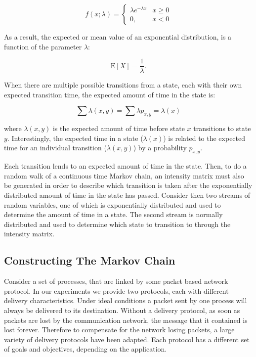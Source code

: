 \begin{equation}
f(x;\lambda) = \begin{cases}
\lambda e^{-\lambda x} & x \ge 0 \\
0, & x < 0
\end{cases}
\end{equation}

As a result, the expected or mean value of an exponential distribution, is a function of
the parameter $\lambda$: \cite{MARKOV1}

\begin{equation}
\mathrm{E}[X] = \frac{1}{\lambda}. \!
\end{equation}

When there are multiple possible transitions from a state, each with their own expected transition time, the expected amount of time in the state is: \cite{MARKOV2}

\begin{equation}
\sum \lambda(x,y) = \sum \lambda p_{x,y} = \lambda(x)
\end{equation}

where $\lambda(x,y)$ is the expected amount of time before state $x$ transitions to state $y$. Interestingly, the expected time in a state ($\lambda(x)$) is related to the expected time for an individual transition ($\lambda(x,y)$) by a probability $p_{x,y}$.

Each transition lends to an expected amount of time in the state. Then, to do a random walk of a continuous time Markov chain, an intensity matrix must also be generated in order to describe which transition is taken after the exponentially distributed amount of time in the state has passed. Consider then two streams of random variables, one of which is exponentially distributed and used to determine the amount of time in a state. The second stream is normally distributed and used to determine which state to transition to through the intensity matrix.



\subsection{Constructing The Markov Chain}

Consider a set of processes, that are linked by some packet based network protocol. In our experiments we provide two protocols, each with different delivery characteristics. Under ideal conditions a packet sent by one process will always be delivered to its destination. Without a delivery protocol, as soon as packets are lost by the communication network, the message that it contained is lost forever. Therefore to compensate for the network losing packets, a large variety of delivery protocols have been adapted. Each protocol has a different set of goals and objectives, depending on the application.

